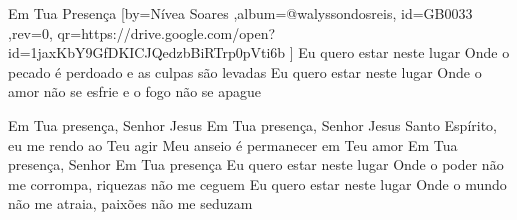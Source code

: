 \beginsong
{Em Tua Presença %
}[by={Nívea Soares %
},album={@walyssondosreis},
id={GB0033 %
},rev={0}, %
qr={https://drive.google.com/open?id=1jaxKbY9GfDKICJQedzbBiRTrp0pVti6b %
}]
\beginverse*
Eu quero estar neste lugar
Onde o pecado é perdoado e as culpas são levadas
Eu quero estar neste lugar
Onde o amor não se esfrie e o fogo não se apague
\endverse

\beginverse*
Em Tua presença, Senhor Jesus
Em Tua presença, Senhor Jesus
\endverse
\beginverse*
Santo Espírito, eu me rendo ao Teu agir
Meu anseio é permanecer em Teu amor
\endverse
\beginchorus
Em Tua presença, Senhor
Em Tua presença
\endchorus
\beginverse*
Eu quero estar neste lugar
Onde o poder não me corrompa, riquezas não me ceguem
Eu quero estar neste lugar
Onde o mundo não me atraia, paixões não me seduzam
\endverse
\vspace{4em} %
\begin{comment}
\lstset{basicstyle=\scriptsize\bf} %
\tab{Solo 1}
\begin{lstlisting}
E|-----------------------------------------------------|
B|-----------------------------------------------------|
G|-----------------------------------------------------|
D|-----------------------------------------------------|
A|-----------------------------------------------------|
E|-----------------------------------------------------|
\end{lstlisting}
\end{comment}
 
